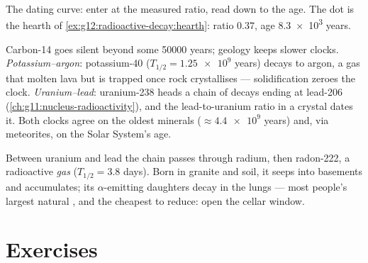 \begin{omfigure}

{\small The dating curve: enter at the measured ratio, read down to the
age. The dot is the hearth of \cref{ex:g12:radioactive-decay:hearth}:
ratio $0.37$, age \num{8.3e3} years.}
\end{omfigure}

\begin{example}\label{ex:g12:radioactive-decay:rocks}
Carbon-14 goes silent beyond some \num{50000} years; geology keeps slower
clocks. \emph{Potassium--argon}: potassium-40 ($T_{1/2} = \num{1.25e9}$
years) decays to argon, a gas that  molten lava but is trapped once
rock crystallises --- solidification zeroes the clock. \emph{Uranium--lead}:
uranium-238 heads a chain of decays ending at  lead-206
(\cref{ch:g11:nucleus-radioactivity}), and the lead-to-uranium ratio in a
crystal dates it. Both clocks agree on the oldest minerals
($\approx \num{4.4e9}$ years) and, via meteorites, on the Solar System's
age.
\end{example}

\begin{remark}\label{rem:g12:radioactive-decay:radon}
Between uranium and lead the chain passes through radium, then radon-222,
a radioactive \emph{gas} ($T_{1/2} = 3.8$ days). Born in granite and
soil, it seeps into basements and accumulates; its $\alpha$-emitting
daughters decay in the lungs --- most people's largest natural , and
the cheapest to reduce: open the cellar window.
\end{remark}

\section{Exercises}

